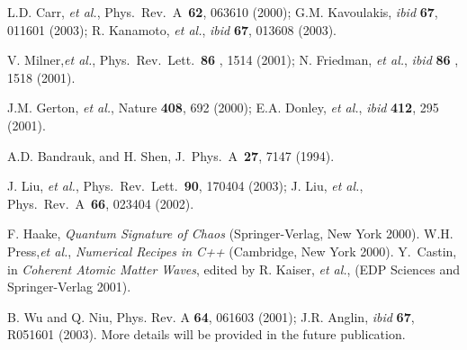 \documentclass[twocolumn,prl,aps,showpacs]{revtex4}
\begin{document}
\begin{references}
  L.D. Carr, {\it et al.}, Phys.\ Rev.\ A\ {\bf 62}, 063610 (2000);
G.M. Kavoulakis, {\it ibid} {\bf 67}, 011601 (2003);
R. Kanamoto, {\it et al.}, {\it ibid} {\bf 67}, 013608 (2003).

  V. Milner,{\it et al.}, Phys.\ Rev.\ Lett.\  {\bf 86%
}, 1514 (2001); N. Friedman, {\it et al.}, {\it ibid} {\bf 86%
}, 1518 (2001).

 J.M. Gerton, {\it et al.}, Nature {\bf 408}, 692 (2000);
E.A. Donley, {\it et al.}, {\it ibid} {\bf 412}, 295 (2001).

 A.D. Bandrauk, and H. Shen, J.\ Phys.\ A\ {\bf 27}, 7147 (1994).

 J. Liu, {\it et al.}, Phys.\ Rev.\ Lett.\ {\bf 90}, 170404 (2003); 
J. Liu, {\it et al.}, Phys.\ Rev.\ A\ {\bf 66}, 023404 (2002).

  F. Haake, {\em Quantum Signature of Chaos\/} (Springer-Verlag, New York
2000).
  W.H. Press,{\it et al.}, {\em Numerical Recipes in C++\/} (Cambridge, New York
2000).
 Y.~Castin, in {\em Coherent Atomic Matter Waves\/},
edited by R. Kaiser, {\it et al.}, {(EDP Sciences and Springer-Verlag 2001)}.

 B. Wu and Q. Niu, Phys. Rev. A {\bf 64}, 061603 (2001); J.R. Anglin, {\it ibid} {\bf 67}, R051601 (2003).
 More details will be provided in the future publication.

\end{references}
\end{document}
